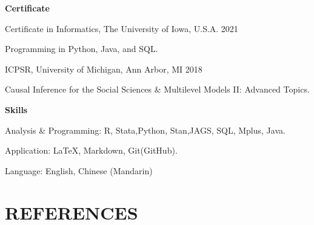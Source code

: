 \documentclass[10.5pt,]{article}
\providecommand{\tightlist}{%
	\setlength{\itemsep}{0pt}\setlength{\parskip}{0pt}}
\renewenvironment{itemize}{
	\begin{list}{}{
			\setlength{\leftmargin}{1.5em}
		}
	}{
	\end{list}
}
\begin{document}
\begin{itemize}
\tightlist
\item
  \textbf{Certificate}

  \begin{itemize}
  \tightlist
  \item
    Certificate in Informatics, The University of Iowa, U.S.A.
    \hfill 2021

    \begin{itemize}
    \tightlist
    \item
      Programming in Python, Java, and SQL.
    \end{itemize}
  \item
    ICPSR, University of Michigan, Ann Arbor, MI \hfill 2018

    \begin{itemize}
    \tightlist
    \item
      Causal Inference for the Social Sciences \& Multilevel Models II:
      Advanced Topics.
    \end{itemize}
  \end{itemize}
\item
  \textbf{Skills}

  \begin{itemize}
  \tightlist
  \item
    Analysis \& Programming: R, Stata,Python, Stan,JAGS, SQL, Mplus,
    Java.
  \item
    Application: \LaTeX, Markdown, Git(GitHub).
  \item
    Language: English, Chinese (Mandarin)
  \end{itemize}
\end{itemize}

\section{REFERENCES}\label{references}
\end{document}
